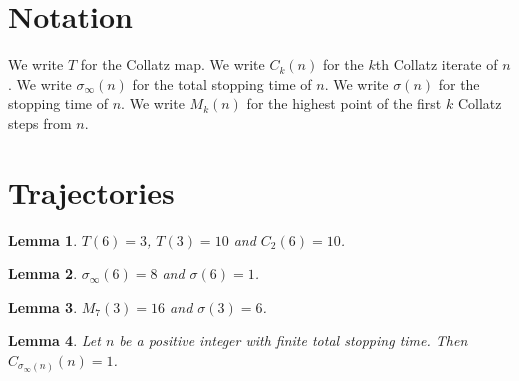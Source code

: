 \documentclass{article}
\newtheorem{lemma}{Lemma}
\begin{document}
\section{Notation}

We write $T$ for the Collatz map.
We write $C_k(n)$ for the $k$th Collatz iterate of $n$.
We write $\sigma_\infty(n)$ for the total stopping time of $n$.
We write $\sigma(n)$ for the stopping time of $n$.
We write $M_k(n)$ for the highest point of the first $k$ Collatz steps from $n$.

\section{Trajectories}

\begin{lemma}\label{map}
$T(6)=3$, $T(3)=10$ and $C_2(6)=10$.
\end{lemma}

\begin{lemma}\label{six}
$\sigma_\infty(6)=8$ and $\sigma(6)=1$.
\end{lemma}

\begin{lemma}\label{three}
$M_7(3)=16$ and $\sigma(3)=6$.
\end{lemma}

\begin{lemma}\label{reach}
Let $n$ be a positive integer with finite total stopping time. Then $C_{\sigma_\infty(n)}(n)=1$.
\end{lemma}
\end{document}
